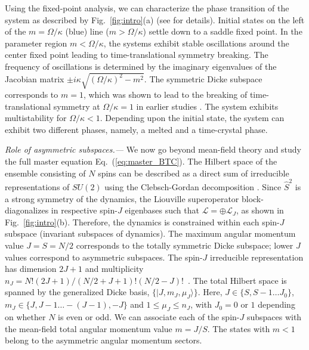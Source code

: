 \documentclass[pra,aps,twocolumn,superscriptaddress,notitlepage]{revtex4-1}
\begin{document}
	
	Using the fixed-point analysis, we can characterize the phase transition of the system as described by Fig.~\ref{fig:intro}(a) (see \cite{supp} for details). 
	Initial states on the left of the $m=\Omega/\kappa$ (blue) line ($m > \Omega/\kappa$) settle down to a saddle fixed point. 
	In the parameter region $m < \Omega/\kappa$, the systems exhibit stable oscillations around the center fixed point leading to 
	time-translational symmetry breaking.
	The frequency of oscillations is determined by the imaginary eigenvalues of the Jacobian matrix $\pm i \kappa \sqrt{(\Omega/\kappa)^2-m^2}$.
	The symmetric Dicke subspace corresponds to $m=1$, which was shown to lead to the breaking of time-translational symmetry at $\Omega/\kappa=1$ in earlier studies \cite{iemini2018boundary,seeding2022michal}.
	The system exhibits multistability for $\Omega/\kappa<1$. 
	Depending upon the initial state, the system can exhibit two different phases, namely, a melted and a time-crystal phase.
	
	
	
	\noindent \textit{Role of asymmetric subspaces.---}
	We now go beyond mean-field theory and study the full master equation Eq.~(\ref{eq:master_BTC}).
	The Hilbert space of the ensemble consisting of $N$ spins can be described as a direct sum of irreducible representations of $SU(2)$ using the Clebsch-Gordan decomposition \cite{sakurai1995modern}.
	Since $\hat{S}^2$ is a strong symmetry of the dynamics, the Liouville superoperator block-diagonalizes \cite{buca2012,thingna2021degenerate} in respective spin-$J$ eigenbases such that $\mathcal{L}=\oplus \mathcal{L}_{J}$, as shown in Fig.~\ref{fig:intro}(b). 
	Therefore, the dynamics is constrained within each spin-$J$ subspace (invariant subspaces of dynamics).
	The maximum angular momentum value $J=S=N/2$ corresponds to the totally symmetric Dicke subspace; lower $J$ values correspond to asymmetric subspaces. The spin-$J$ irreducible representation has dimension $2J+1$ and multiplicity $n_{J} = N! (2J+1)/(N/2+J+1)!(N/2-J)!$~\cite{georgi2000lie,ramadevi2019group,yadin2023thermo}.
	The total Hilbert space is spanned by the generalized Dicke basis, $\{ |J,m_{J},\mu_J \rangle \}$.
	Here, $J \in \{S,S-1 \ldots J_{0}\}$, $m_J \in \{J,J-1 \ldots -(J-1),-J\}$ and $ 1 \leq \mu_J \leq n_J$, with $J_0 = 0 \text{ or } 1$ depending on whether $N$ is even or odd.
	We can associate each of the spin-$J$ subspaces with the mean-field total angular momentum value $m=J/S$.
	The states with $m<1$ belong to the asymmetric angular momentum sectors.
	
\end{document}
